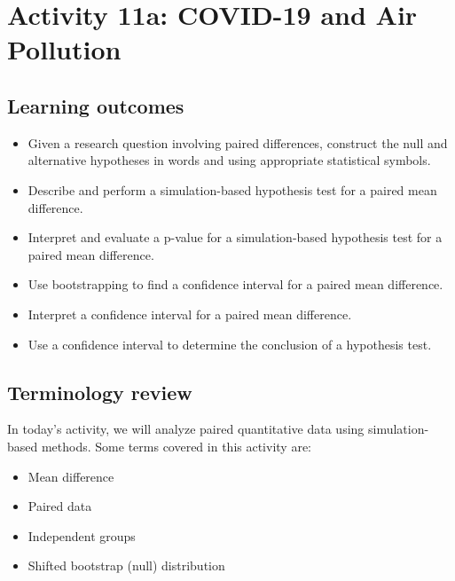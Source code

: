\documentclass[
]{report}
\begin{document}
\newpage

\hypertarget{activity-11a-covid-19-and-air-pollution}{%
\section{Activity 11a: COVID-19 and Air Pollution}\label{activity-11a-covid-19-and-air-pollution}}


\hypertarget{learning-outcomes-5}{%
\subsection{Learning outcomes}\label{learning-outcomes-5}}

\begin{itemize}
\item
  Given a research question involving paired differences, construct the null and alternative hypotheses
  in words and using appropriate statistical symbols.
\item
  Describe and perform a simulation-based hypothesis test for a paired mean difference.
\item
  Interpret and evaluate a p-value for a simulation-based hypothesis test for a paired mean difference.
\item
  Use bootstrapping to find a confidence interval for a paired mean difference.
\item
  Interpret a confidence interval for a paired mean difference.
\item
  Use a confidence interval to determine the conclusion of a hypothesis test.
\end{itemize}

\hypertarget{terminology-review-16}{%
\subsection{Terminology review}\label{terminology-review-16}}

In today's activity, we will analyze paired quantitative data using simulation-based methods. Some terms covered in this activity are:

\begin{itemize}
\item
  Mean difference
\item
  Paired data
\item
  Independent groups
\item
  Shifted bootstrap (null) distribution
\end{itemize}
\end{document}

